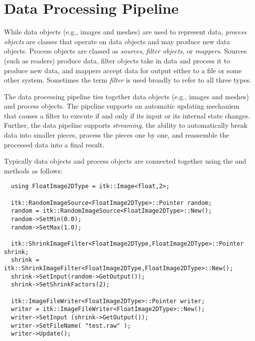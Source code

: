 \section{Data Processing Pipeline}
\label{sec:DataProcessingPipeline}



While data objects (e.g., images and meshes) are used to represent data,
\emph{process objects} are classes that operate on data objects and may
produce new data objects. Process objects are classed as
\emph{sources}, \emph{filter objects}, or \emph{mappers}.  Sources (such as
readers) produce data, filter objects take in data and process it to produce
new data, and mappers accept data for output either to a file or
some other system.  Sometimes the term \emph{filter} is used broadly
to refer to all three types.


The data processing pipeline ties together data objects (e.g., images and
meshes) and process objects. The pipeline supports an automatic updating
mechanism that causes a filter to execute if and only if its input
or its internal state changes. Further, the data pipeline supports
\emph{streaming}, the ability to automatically break data into smaller
pieces, process the pieces one by one, and reassemble the processed data into
a final result.

Typically data objects and process objects are connected together using the
 and  methods as follows:

\small
\begin{verbatim}
  using FloatImage2DType = itk::Image<float,2>;

  itk::RandomImageSource<FloatImage2DType>::Pointer random;
  random = itk::RandomImageSource<FloatImage2DType>::New();
  random->SetMin(0.0);
  random->SetMax(1.0);

  itk::ShrinkImageFilter<FloatImage2DType,FloatImage2DType>::Pointer shrink;
  shrink = itk::ShrinkImageFilter<FloatImage2DType,FloatImage2DType>::New();
  shrink->SetInput(random->GetOutput());
  shrink->SetShrinkFactors(2);

  itk::ImageFileWriter<FloatImage2DType>::Pointer writer;
  writer = itk::ImageFileWriter<FloatImage2DType>::New();
  writer->SetInput (shrink->GetOutput());
  writer->SetFileName( "test.raw" );
  writer->Update();
\end{verbatim}
\normalsize

